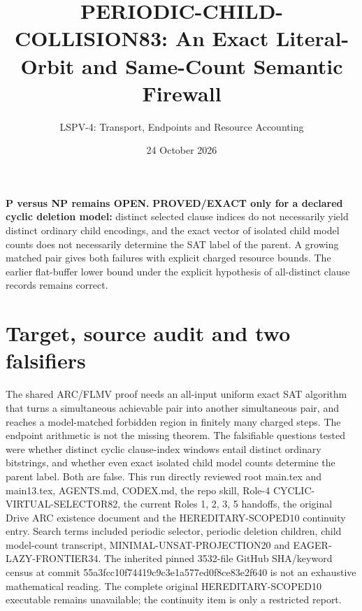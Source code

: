 \documentclass[11pt]{article}
\title{PERIODIC-CHILD-COLLISION83: An Exact Literal-Orbit and Same-Count Semantic Firewall}
\author{LSPV-4: Transport, Endpoints and Resource Accounting}
\date{24 October 2026}
\begin{document}
\maketitle
\noindent\textbf{P versus NP remains OPEN.}
\textbf{PROVED/EXACT only for a declared cyclic deletion model:} distinct selected clause indices do not necessarily yield distinct ordinary child encodings, and the exact vector of isolated child model counts does not necessarily determine the SAT label of the parent. A growing matched pair gives both failures with explicit charged resource bounds. The earlier flat-buffer lower bound under the explicit hypothesis of all-distinct clause records remains correct.

\section{Target, source audit and two falsifiers}
The shared ARC/FLMV proof needs an all-input uniform exact SAT algorithm that turns a simultaneous achievable pair into another simultaneous pair, and reaches a model-matched forbidden region in finitely many charged steps. The endpoint arithmetic is not the missing theorem. The falsifiable questions tested were whether distinct cyclic clause-index windows entail distinct ordinary bitstrings, and whether even exact isolated child model counts determine the parent label. Both are false.
This run directly reviewed root main.tex and main13.tex, AGENTS.md, CODEX.md, the repo skill, Role-4 CYCLIC-VIRTUAL-SELECTOR82, the current Roles 1, 2, 3, 5 handoffs, the original Drive ARC existence document and the HEREDITARY-SCOPED10 continuity entry. Search terms included periodic selector, periodic deletion children, child model-count transcript, MINIMAL-UNSAT-PROJECTION20 and EAGER-LAZY-FRONTIER34. The inherited pinned 3532-file GitHub SHA/keyword census at commit 55a3fcc10f74419c9c3e1a577ed0f8ce83e2f640 is not an exhaustive mathematical reading. The complete original HEREDITARY-SCOPED10 executable remains unavailable; the continuity item is only a restricted report.
\end{document}

